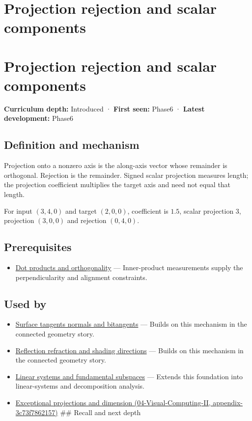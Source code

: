 \hypertarget{appendix-505a502c372a}{}
\section*{Projection rejection and scalar components}
\section{Projection rejection and scalar components}\label{appendix-505a502c372a-projection-rejection-and-scalar-components}

\textbf{Curriculum depth:} Introduced · \textbf{First seen:} Phase6 · \textbf{Latest development:} Phase6

\subsection{Definition and mechanism}\label{appendix-505a502c372a-definition-and-mechanism}

Projection onto a nonzero axis is the along-axis vector whose remainder is orthogonal. Rejection is the remainder. Signed scalar projection measures length; the projection coefficient multiplies the target axis and need not equal that length.

For input \((3,4,0)\) and target \((2,0,0)\), coefficient is \(1.5\), scalar projection \(3\), projection \((3,0,0)\) and rejection \((0,4,0)\).

\subsection{Prerequisites}\label{appendix-505a502c372a-prerequisites}

\begin{itemize}
\tightlist
\item
  \hyperref[appendix-8bc4e8fc547c]{Dot products and orthogonality} --- Inner-product measurements supply the perpendicularity and alignment constraints.
\end{itemize}

\subsection{Used by}\label{appendix-505a502c372a-used-by}

\begin{itemize}
\item
  \hyperref[appendix-e31893dec985]{Surface tangents normals and bitangents} --- Builds on this mechanism in the connected geometry story.
\item
  \hyperref[appendix-44e00863b4d5]{Reflection refraction and shading directions} --- Builds on this mechanism in the connected geometry story.
\item
  \hyperref[appendix-8572a4a060c1]{Linear systems and fundamental subspaces} --- Extends this foundation into linear-systems and decomposition analysis.
\item
  \href{../04-Visual-Computing-II/main.pdf\#nameddest=appendix-3c73f7862157}{Exceptional projections and dimension (04-Visual-Computing-II, appendix-3c73f7862157)} \#\# Recall and next depth
\end{itemize}

